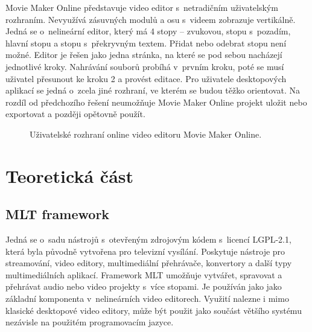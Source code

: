Movie Maker Online představuje video editor s~netradičním uživatelským rozhraním. Nevyužívá zásuvných modulů a osu s~videem zobrazuje vertikálně. Jedná se o~nelineární editor, který má 4 stopy -- zvukovou, stopu s~pozadím, hlavní stopu a stopu s~překryvným textem. Přidat nebo odebrat stopu není možné. Editor je řešen jako jedna stránka, na které se pod sebou nacházejí jednotlivé kroky. Nahrávání souborů probíhá v~prvním kroku, poté se musí uživatel přesunout ke kroku 2 a provést editace. Pro uživatele desktopových aplikací se jedná o~zcela jiné rozhraní, ve kterém se budou těžko orientovat. Na rozdíl od předchozího řešení neumožňuje Movie Maker Online projekt uložit nebo exportovat a později opětovně použít. 
\begin{figure}[ht]
	\centering
	\caption{Uživatelské rozhraní online video editoru Movie Maker Online. }\label{img:moviemakeronline}
\end{figure}

\chapter{Teoretická část}
\section{MLT framework}
Jedná se o~sadu nástrojů s~otevřeným zdrojovým kódem s~licencí LGPL-2.1, která byla původně vytvořena pro televizní vysílání. Poskytuje nástroje pro streamování, video editory, multimediální přehrávače, konvertory a další typy multimediálních aplikací. Framework MLT umožňuje vytvářet, spravovat a přehrávat audio nebo video projekty s~více stopami. Je používán jako jako základní komponenta v~nelineárních video editorech. Využití nalezne i mimo klasické desktopové video editory, může být použit jako součást většího systému nezávisle na použitém programovacím jazyce.

